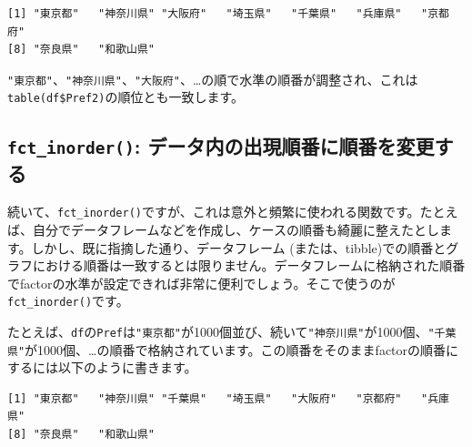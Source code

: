 \documentclass[
  a4paper,
  pandoc,
  ja=standard,
  jafont=haranoaji]{bxjsbook}
\newenvironment{Shaded}{\begin{snugshade}}{\end{snugshade}}
\newcommand{\AttributeTok}[1]{\textcolor[rgb]{0.00,0.48,0.65}{#1}}
\newcommand{\CommentTok}[1]{\textcolor[rgb]{0.37,0.37,0.37}{#1}}
\newcommand{\FunctionTok}[1]{\textcolor[rgb]{0.28,0.35,0.67}{#1}}
\newcommand{\NormalTok}[1]{\textcolor[rgb]{0.00,0.48,0.65}{#1}}
\newcommand{\OtherTok}[1]{\textcolor[rgb]{0.00,0.48,0.65}{#1}}
\newcommand{\SpecialCharTok}[1]{\textcolor[rgb]{0.37,0.37,0.37}{#1}}
\begin{document}
\begin{verbatim}
[1] "東京都"   "神奈川県" "大阪府"   "埼玉県"   "千葉県"   "兵庫県"   "京都府"  
[8] "奈良県"   "和歌山県"
\end{verbatim}

\texttt{"東京都"}、\texttt{"神奈川県"}、\texttt{"大阪府"}、\ldots の順で水準の順番が調整され、これは\texttt{table(df\$Pref2)}の順位とも一致します。

\hypertarget{fct_inorder-ux30c7ux30fcux30bfux5185ux306eux51faux73feux9806ux756aux306bux9806ux756aux3092ux5909ux66f4ux3059ux308b}{%
\subsection{\texorpdfstring{\texttt{fct\_inorder()}:
データ内の出現順番に順番を変更する}{fct\_inorder(): データ内の出現順番に順番を変更する}}\label{fct_inorder-ux30c7ux30fcux30bfux5185ux306eux51faux73feux9806ux756aux306bux9806ux756aux3092ux5909ux66f4ux3059ux308b}}

続いて、\texttt{fct\_inorder()}ですが、これは意外と頻繁に使われる関数です。たとえば、自分でデータフレームなどを作成し、ケースの順番も綺麗に整えたとします。しかし、既に指摘した通り、データフレーム
(または、tibble)での順番とグラフにおける順番は一致するとは限りません。データフレームに格納された順番でfactorの水準が設定できれば非常に便利でしょう。そこで使うのが\texttt{fct\_inorder()}です。

たとえば、\texttt{df}の\texttt{Pref}は\texttt{"東京都"}が1000個並び、続いて\texttt{"神奈川県"}が1000個、\texttt{"千葉県"}が1000個、\ldots の順番で格納されています。この順番をそのままfactorの順番にするには以下のように書きます。

\begin{Shaded}
\end{Shaded}

\begin{verbatim}
[1] "東京都"   "神奈川県" "千葉県"   "埼玉県"   "大阪府"   "京都府"   "兵庫県"  
[8] "奈良県"   "和歌山県"
\end{verbatim}
\end{document}
